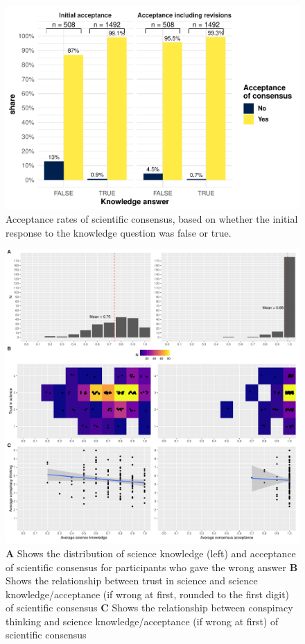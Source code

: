 \documentclass[
  doc,floatsintext]{apa6}
\begin{document}
\begin{figure}
\centering
\includegraphics{output/figures/exp3-conditional-acceptance.pdf}
\caption{\label{fig:exp3-conditional-acceptance}Acceptance rates of scientific consensus, based on whether the initial response to the knowledge question was false or true.}
\end{figure}



\begin{figure}
\centering
\includegraphics{output/figures/exp3-plot-overview.pdf}
\caption{\label{fig:exp3-plot-overview}\textbf{A} Shows the distribution of science knowledge (left) and acceptance of scientific consensus for participants who gave the wrong answer \textbf{B} Shows the relationship between trust in science and science knowledge/acceptance (if wrong at first, rounded to the first digit) of scientific consensus \textbf{C} Shows the relationship between conspiracy thinking and science knowledge/acceptance (if wrong at first) of scientific consensus}
\end{figure}
\end{document}
